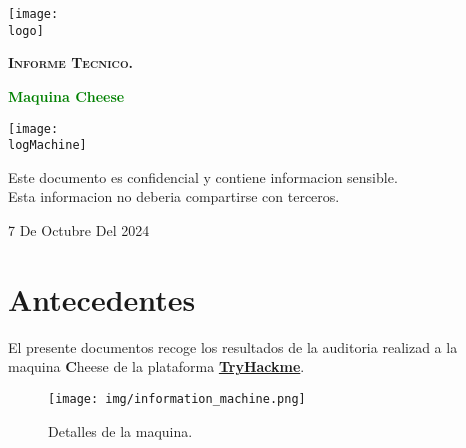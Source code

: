 \documentclass[a4paper]{article} %
\newcommand{\logMachine}{img/logCheese.jpg}
\newcommand{\logo}{img/tryhackme_log.png}
\newcommand{\machineName}{Cheese} %
\newcommand{\startDate}{7 De Octubre Del 2024}
\begin{document}
	\cfoot{\thepage}
	\begin{titlepage}	
	\center
	\texttt{[image: \\logo]}\par\vspace{1cm}
	{\scshape\LARGE\textbf{Informe Tecnico.}\par\vspace{0.3cm}}	
	{\Huge\bfseries\textcolor{green}{Maquina \machineName}}\par
	\vfill\vfill
	\texttt{[image: \\logMachine]}\par\vspace{1cm}
	\vfill
	\begin{tcolorbox}[colback=red!5!white,colframe=red!75!black]
		\center
		\LARGE{Este documento es confidencial y contiene informacion sensible.\\Esta informacion no deberia compartirse con terceros.}
	\end{tcolorbox}
	\vfill
	{\large\startDate\par}
	\vfill 
	\end{titlepage}
	\clearpage
	\tableofcontents
	\clearpage
	
	\section{Antecedentes}
	El presente documentos recoge los resultados de la auditoria realizad a la maquina {\textbf \machineName} de la plataforma \href{https://tryhackme.com}{\textbf{\color{blue}TryHackme}}.
	\vspace{0.4cm}
	\begin{figure}[h]
	\center
	\texttt{[image: img/information\_machine.png]}
	\caption{Detalles de la maquina.} %
	\end{figure}
	
	\vspace{0.3cm}
	\begin{tcolorbox}[enhanced,attach boxed title to top center={yshift=-3mm,yshifttext=-1mm},
  		colback=blue!5!white,colframe=black!75!black,colbacktitle=black!80!black,
		title=Url=\bfseries,
 		boxed title style={size=small,colframe=red!50!black} ]
 		\center
		\href{https://tryhackme.com/r/room/cheesectfv10}{\color{black}{https://tryhackme.com/r/room/cheesectfv10}}
	\end{tcolorbox}
\end{document}
